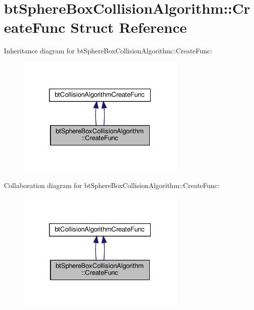 \hypertarget{structbtSphereBoxCollisionAlgorithm_1_1CreateFunc}{}\section{bt\+Sphere\+Box\+Collision\+Algorithm\+:\+:Create\+Func Struct Reference}
\label{structbtSphereBoxCollisionAlgorithm_1_1CreateFunc}


Inheritance diagram for bt\+Sphere\+Box\+Collision\+Algorithm\+:\+:Create\+Func\+:
\nopagebreak
\begin{figure}[H]
\begin{center}
\leavevmode
\includegraphics[width=235pt]{structbtSphereBoxCollisionAlgorithm_1_1CreateFunc__inherit__graph}
\end{center}
\end{figure}


Collaboration diagram for bt\+Sphere\+Box\+Collision\+Algorithm\+:\+:Create\+Func\+:
\nopagebreak
\begin{figure}[H]
\begin{center}
\leavevmode
\includegraphics[width=235pt]{structbtSphereBoxCollisionAlgorithm_1_1CreateFunc__coll__graph}
\end{center}
\end{figure}
